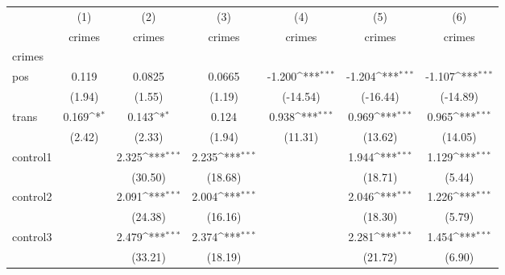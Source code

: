 {
\def\sym#1{\ifmmode^{#1}\else\(^{#1}\)\fi}
\begin{tabular}{l*{6}{c}}
\hline\hline
            &\multicolumn{1}{c}{(1)}&\multicolumn{1}{c}{(2)}&\multicolumn{1}{c}{(3)}&\multicolumn{1}{c}{(4)}&\multicolumn{1}{c}{(5)}&\multicolumn{1}{c}{(6)}\\
            &\multicolumn{1}{c}{crimes}&\multicolumn{1}{c}{crimes}&\multicolumn{1}{c}{crimes}&\multicolumn{1}{c}{crimes}&\multicolumn{1}{c}{crimes}&\multicolumn{1}{c}{crimes}\\
\hline
crimes      &                     &                     &                     &                     &                     &                     \\
pos         &       0.119         &      0.0825         &      0.0665         &      -1.200\sym{***}&      -1.204\sym{***}&      -1.107\sym{***}\\
            &      (1.94)         &      (1.55)         &      (1.19)         &    (-14.54)         &    (-16.44)         &    (-14.89)         \\
[1em]
trans       &       0.169\sym{*}  &       0.143\sym{*}  &       0.124         &       0.938\sym{***}&       0.969\sym{***}&       0.965\sym{***}\\
            &      (2.42)         &      (2.33)         &      (1.94)         &     (11.31)         &     (13.62)         &     (14.05)         \\
[1em]
control1    &                     &       2.325\sym{***}&       2.235\sym{***}&                     &       1.944\sym{***}&       1.129\sym{***}\\
            &                     &     (30.50)         &     (18.68)         &                     &     (18.71)         &      (5.44)         \\
[1em]
control2    &                     &       2.091\sym{***}&       2.004\sym{***}&                     &       2.046\sym{***}&       1.226\sym{***}\\
            &                     &     (24.38)         &     (16.16)         &                     &     (18.30)         &      (5.79)         \\
[1em]
control3    &                     &       2.479\sym{***}&       2.374\sym{***}&                     &       2.281\sym{***}&       1.454\sym{***}\\
            &                     &     (33.21)         &     (18.19)         &                     &     (21.72)         &      (6.90)         \\

\end{tabular}}
